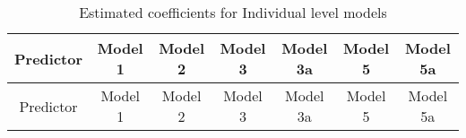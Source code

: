 \documentclass[12pt,twoside]{reedthesis}
\begin{document}
  \begin{longtable}[]{@{}ccccccc@{}}
  \caption{Estimated coefficients for Individual level models
  \label{tab:model_indiv_coefs}}\tabularnewline
  \toprule
  \begin{minipage}[b]{0.14\columnwidth}\centering\strut
  Predictor\strut
  \end{minipage} & \begin{minipage}[b]{0.10\columnwidth}\centering\strut
  Model 1\strut
  \end{minipage} & \begin{minipage}[b]{0.11\columnwidth}\centering\strut
  Model 2\strut
  \end{minipage} & \begin{minipage}[b]{0.11\columnwidth}\centering\strut
  Model 3\strut
  \end{minipage} & \begin{minipage}[b]{0.11\columnwidth}\centering\strut
  Model 3a\strut
  \end{minipage} & \begin{minipage}[b]{0.11\columnwidth}\centering\strut
  Model 5\strut
  \end{minipage} & \begin{minipage}[b]{0.12\columnwidth}\centering\strut
  Model 5a\strut
  \end{minipage}\tabularnewline
  \midrule
  \endfirsthead
  \toprule
  \begin{minipage}[b]{0.14\columnwidth}\centering\strut
  Predictor\strut
  \end{minipage} & \begin{minipage}[b]{0.10\columnwidth}\centering\strut
  Model 1\strut
  \end{minipage} & \begin{minipage}[b]{0.11\columnwidth}\centering\strut
  Model 2\strut
  \end{minipage} & \begin{minipage}[b]{0.11\columnwidth}\centering\strut
  Model 3\strut
  \end{minipage} & \begin{minipage}[b]{0.11\columnwidth}\centering\strut
  Model 3a\strut
  \end{minipage} & \begin{minipage}[b]{0.11\columnwidth}\centering\strut
  Model 5\strut
  \end{minipage} & \begin{minipage}[b]{0.12\columnwidth}\centering\strut
  Model 5a\strut
  \end{minipage}\tabularnewline

\end{longtable}
\end{document}
